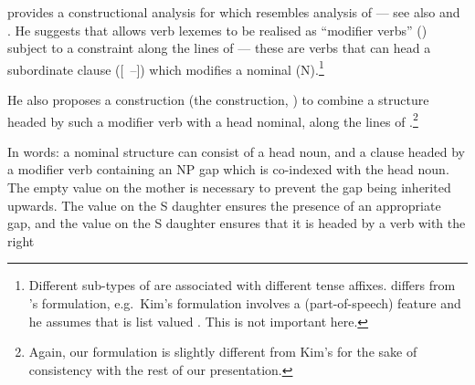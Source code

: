 \documentclass[output=paper
 	        ,biblatex
                ,babelshorthands
                ,newtxmath
                ,draftmode
                ,colorlinks, citecolor=brown
]{langscibook}
\begin{document}
\cite{Kim16SyntacticStrKorean} provides a constructional analysis for  which
resembles  analysis of  --- see also \cite{kim1998head-driven-KoreanRC} and
\cite{kim-yang2003koreanlkb}. He suggests that  allows verb lexemes
to be realised as ``modifier verbs'' () subject to a constraint along the
lines of  --- these are verbs that can head a subordinate clause ([~{--}])
which modifies a nominal (N).\footnote{Different sub-types of  are associated
  with different tense affixes.  differs from
  \citeauthor{Kim16SyntacticStrKorean}'s formulation, e.g.\ Kim's formulation involves a
   (part-of-speech) feature and he assumes that  is list valued
  \citep[see][285]{Kim16SyntacticStrKorean}. This is not important here.}
\begin{exe}\ex\label{x:rc-86}
\end{exe}
He   also   proposes   a  construction   (the     construction,
\citealt[see][290]{Kim16SyntacticStrKorean})  to  combine a  structure  headed  by such  a
modifier verb  with a head  nominal, along  the lines of  .\footnote{Again, our
  formulation is slightly different from Kim's for  the sake of consistency with the rest of
  our presentation. }
\begin{exe}\ex\label{x:rc-87}
\end{exe}
In words: a nominal structure can consist of a head noun, and a clause headed by a
modifier verb containing an NP gap which is co-indexed with the head noun. The empty
 value on the mother is necessary to prevent the gap being inherited
upwards. The  value on the S daughter ensures the presence of an appropriate gap, and the
 value on the S daughter ensures that it is headed by a verb with the right
\end{document}
